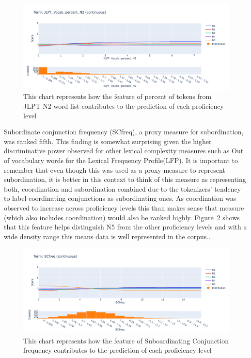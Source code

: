 \begin{figure}[h!]
    \centering
    \includegraphics[scale=.4]{img/EBM/JLPTn2P}
    \caption[Contribution of percentage of tokens from JLPT N2 vocabulary list]{This chart represents how the feature of percent of tokens from JLPT N2 word list contributes to the prediction of each proficiency level}
    \label{fig:EBMjlptN2}
\end{figure}

Subordinate conjunction frequency (SCfreq), a proxy measure for subordination, was ranked fifth. This finding is
somewhat surprising given the higher discriminative power observed for other lexical complexity measures such as Out
of vocabulary words for the Lexical Frequency Profile(LFP). It is important to remember that even though this was
used as a proxy measure to represent subordination, it is better in this context to think of this measure as
representing both, coordination and subordination combined due to the tokenizers' tendency to label coordinating
conjunctions
as subordinating ones. As coordination was observed to increase across proficiency levels this than makes sense that
measure (which also includes coordination) would also be ranked highly. Figure~\ref{fig:EBMSCfreq} shows that this
feature helps distinguish N5 from the other proficiency levels and with a wide density range this means data is
well represented in the corpus..

\begin{figure}[h!]
    \centering
    \includegraphics[scale=.4]{img/EBM/EBMSCfreq}
    \caption[Contribution of Subordinating Conjuction Frequency]{This chart represents how the feature of Suboardinating Conjunction frequency contributes to the prediction of each proficiency level}
    \label{fig:EBMSCfreq}
\end{figure}

